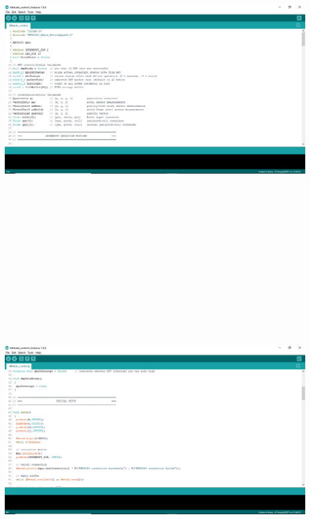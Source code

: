 \documentclass[9pt]{article}
\begin{document}
\begin{flushleft}

\includegraphics[width=175mm,height=135mm]{23.jpg}
\newpage
\includegraphics[width=175mm,height=165mm]{24.jpg}

\end{flushleft}
\end{document}
